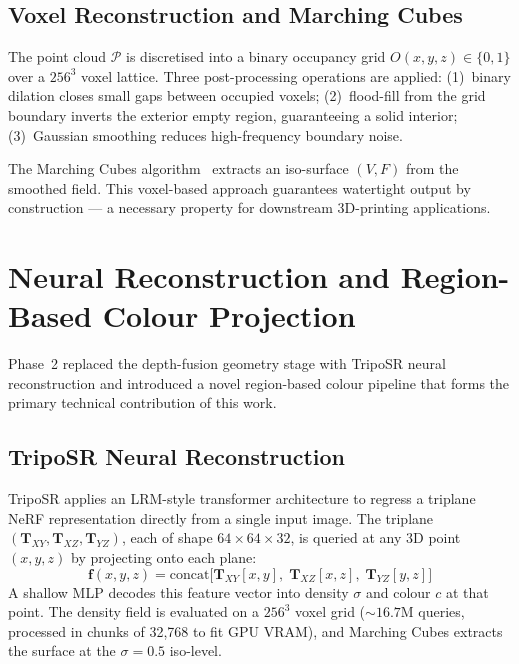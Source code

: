 ﻿\documentclass[conference]{IEEEtran}
\begin{document}
\subsection{Voxel Reconstruction and Marching Cubes}

The point cloud $\mathcal{P}$ is discretised into a binary occupancy grid
$O(x,y,z) \in \{0,1\}$ over a $256^3$ voxel lattice. Three post-processing operations are applied:
(1)~binary dilation closes small gaps between occupied voxels;
(2)~flood-fill from the grid boundary inverts the exterior empty region, guaranteeing a solid interior;
(3)~Gaussian smoothing reduces high-frequency boundary noise.

The Marching Cubes algorithm~\cite{marching_cubes} extracts an iso-surface $(V, F)$ from the smoothed field.
This voxel-based approach guarantees watertight output by construction — a necessary property for downstream
3D-printing applications.

\section{Neural Reconstruction and Region-Based Colour Projection}

Phase~2 replaced the depth-fusion geometry stage with TripoSR neural reconstruction and introduced a novel
region-based colour pipeline that forms the primary technical contribution of this work.

\subsection{TripoSR Neural Reconstruction}

TripoSR applies an LRM-style transformer architecture to regress a triplane NeRF representation directly from
a single input image. The triplane $(\mathbf{T}_{XY}, \mathbf{T}_{XZ}, \mathbf{T}_{YZ})$, each of shape
$64 \times 64 \times 32$, is queried at any 3D point $(x,y,z)$ by projecting onto each plane:
\begin{equation}
\mathbf{f}(x,y,z) = \text{concat}\bigl[\mathbf{T}_{XY}[x,y], \; \mathbf{T}_{XZ}[x,z], \; \mathbf{T}_{YZ}[y,z]\bigr]
\end{equation}
A shallow MLP decodes this feature vector into density $\sigma$ and colour $c$ at that point. The density field
is evaluated on a $256^3$ voxel grid ($\sim 16.7\text{M}$ queries, processed in chunks of 32,768 to fit GPU
VRAM), and Marching Cubes extracts the surface at the $\sigma = 0.5$ iso-level.
\end{document}
